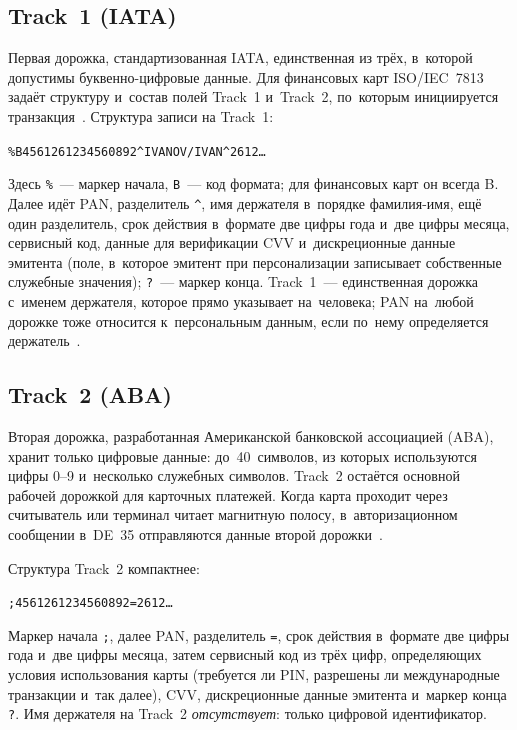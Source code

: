 \subsection*{Track~1 (IATA)}

Первая дорожка, стандартизованная IATA, единственная из трёх, в~которой
допустимы буквенно-цифровые данные. Для финансовых карт ISO/IEC~7813 задаёт
структуру и~состав полей Track~1 и~Track~2, по~которым инициируется
транзакция~\cite{iso-7813,visa-tadg}. Структура записи на Track~1:

\begin{center}
  \texttt{\%B4561261234560892\^{}IVANOV/IVAN\^{}2612\ldots}
\end{center}

Здесь \texttt{\%}~--- маркер начала, \texttt{B}~--- код формата;
для финансовых карт он всегда B. Далее идёт PAN, разделитель \texttt{\^{}}, имя
держателя в~порядке фамилия-имя, ещё один разделитель, срок действия в~формате
две цифры года и~две цифры месяца, сервисный код, данные для верификации CVV
и~дискреционные данные эмитента (поле, в~которое эмитент при персонализации
записывает собственные служебные значения); \texttt{?}~--- маркер конца.
Track~1~--- единственная дорожка с~именем держателя, которое прямо указывает
на~человека; PAN на~любой дорожке тоже относится к~персональным данным, если
по~нему определяется держатель~\cite{fz-152}.

\subsection*{Track~2 (ABA)}

Вторая дорожка, разработанная Американской банковской ассоциацией (ABA), хранит
только цифровые данные: до~40~символов, из которых используются цифры 0--9
и~несколько служебных символов. Track~2 остаётся основной рабочей дорожкой для
карточных платежей. Когда карта проходит через считыватель или терминал читает
магнитную полосу, в~авторизационном сообщении в~DE~35 отправляются данные
второй дорожки~\cite{visa-tadg}.

Структура Track~2 компактнее:

\begin{center}
  \texttt{;4561261234560892=2612\ldots}
\end{center}

Маркер начала \texttt{;}, далее PAN, разделитель \texttt{=}, срок действия
в~формате две цифры года и~две цифры месяца, затем сервисный код из трёх цифр,
определяющих условия использования карты (требуется ли PIN, разрешены ли
международные транзакции и~так далее), CVV, дискреционные данные эмитента
и~маркер конца \texttt{?}. Имя держателя на Track~2 \emph{отсутствует}: только
цифровой идентификатор.

